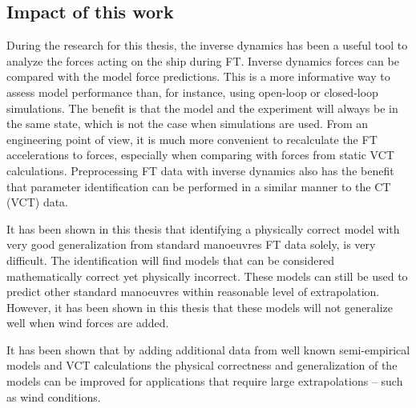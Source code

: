 \subsection*{Impact of this work}
During the research for this thesis, the inverse dynamics has been a useful tool to analyze the forces acting on the ship during FT. Inverse dynamics forces can be compared with the model force predictions. This is a more informative way to assess model performance than, for instance, using open-loop or closed-loop simulations. The benefit is that the model and the experiment will always be in the same state, which is not the case when simulations are used. From an engineering point of view, it is much more convenient to recalculate the FT accelerations to forces, especially when comparing with forces from static VCT calculations. Preprocessing FT data with inverse dynamics also has the benefit that parameter identification can be performed in a similar manner to the CT (VCT) data. 

It has been shown in this thesis that identifying a physically correct model with very good generalization from standard manoeuvres FT data solely, is very difficult. The identification will find models that can be considered mathematically correct yet physically incorrect. These models can still be used to predict other standard manoeuvres within reasonable level of extrapolation. However, it has been shown in this thesis that these models will not generalize well when wind forces are added.

It has been shown that by adding additional data from well known semi-empirical models and VCT calculations the physical correctness and generalization of the models can be improved for applications that require large extrapolations -- such as wind conditions.    